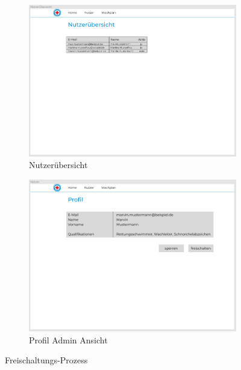 \documentclass[fontsize=12pt,openright,oneside,paper=a4,BCOR=1cm]{scrbook}
\begin{document}
\begin{figure}[H]
  \centering
  \begin{subfigure}[b]{0.4\linewidth}
    \includegraphics[width=\linewidth]{Anlagen/Figma/6-Nutzeruebersicht.png}
    \caption{Nutzerübersicht}
  \end{subfigure}
  \begin{subfigure}[b]{0.4\linewidth}
    \includegraphics[width=\linewidth]{Anlagen/Figma/7-ProfilAdminSicht.png}
    \caption{Profil Admin Ansicht}
  \end{subfigure}
  \caption{Freischaltungs-Prozess}
  \label{fig:freischaltprozess}
\end{figure}

\end{document}

